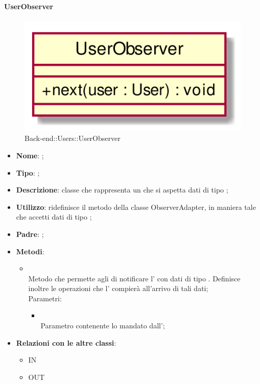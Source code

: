 \hypertarget{UserObserver_label}{\paragraph{UserObserver}}
\begin{figure}[h]
	\centering
	\includegraphics[width=\textwidth,height=\textheight,keepaspectratio]{images/ClassUserObserver.png}
	\caption{Back-end::Users::UserObserver}
\end{figure}
\begin{itemize}
	\item \textbf{Nome}: ;
	\item \textbf{Tipo}: ;
	\item \textbf{Descrizione}: classe che rappresenta un  che si aspetta dati di tipo ;
	\item \textbf{Utilizzo}: ridefinisce il metodo  della classe ObserverAdapter, in maniera tale che accetti dati di tipo ;
	\item \textbf{Padre}: ;
	\item \textbf{Metodi}:
	\begin{itemize}
		\item[]  \\
		Metodo che permette agli  di notificare l' con dati di tipo . Definisce inoltre le operazioni che l' compierà all'arrivo di tali dati;\\
		Parametri:
		\begin{itemize}
			\item {} \\
			Parametro contenente lo  mandato dall';
		\end{itemize}
	\end{itemize}
	\item \textbf{Relazioni con le altre classi}:
	\begin{itemize}
		\item IN \hyperlink{UserObservable_label}{}
		\item OUT \hyperlink{User_label}{}
	\end{itemize}
\end{itemize}
\FloatBarrier

